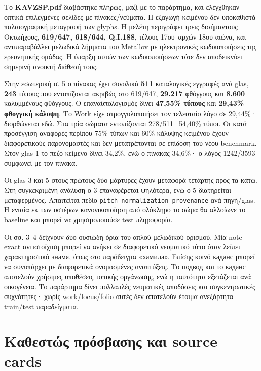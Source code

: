 \documentclass[
  10pt,
  a4paper,
]{report}
\begin{document}
Το \textbf{KAVZSP.pdf} διαβάστηκε πλήρως, μαζί με το παράρτημα, και
ελέγχθηκαν οπτικά επιλεγμένες σελίδες με πίνακες/νεύματα. Η εξαγωγή
κειμένου δεν υποκαθιστά παλαιογραφική μεταγραφή των glyphs. Η μελέτη
περιγράφει τρεις δισήμαντους Οκτωήχους, \textbf{619/647, 618/644,
Q.I.188}, τέλους 17ου--αρχών 18ου αιώνα, και αντιπαραβάλλει μελωδικά
λήμματα του Metallov με ηλεκτρονικές κωδικοποιήσεις της ερευνητικής
ομάδας. Η ύπαρξη αυτών των κωδικοποιήσεων τότε δεν αποδεικνύει σημερινή
ανοικτή διάθεσή τους.

Στην εσωτερική σ. 5 ο πίνακας έχει συνολικά \textbf{511} καταλογικές
εγγραφές ανά glas, \textbf{243} τύπους που εντοπίζονται ακριβώς στο
619/647, \textbf{29.217} φθόγγους και \textbf{8.600} καλυμμένους
φθόγγους. Ο επαναϋπολογισμός δίνει \textbf{47,55\% τύπους} και
\textbf{29,43\% φθογγική κάλυψη}. Το Work είχε στρογγυλοποιήσει τον
τελευταίο λόγο σε 29,44\%· διορθώνεται εδώ. Στα τρία σώματα εντοπίζονται
278/511=54,40\% τύποι. Οι κατά προσέγγιση αναφορές περίπου 75\% τύπων
και 60\% κάλυψης κειμένου έχουν διαφορετικούς παρονομαστές και δεν
μετατρέπονται σε επίδοση του νέου benchmark. Στον glas 1 το πεζό κείμενο
δίνει 34,2\%, ενώ ο πίνακας 34,6\%· ο λόγος 1242/3593 συμφωνεί με τον
πίνακα.

Οι glas 3 και 5 στους πρώτους δύο μάρτυρες έχουν μεταφορά τετάρτης προς
τα κάτω. Στη συγκεκριμένη ανάλυση ο 3 επαναφέρεται ψηλότερα, ενώ ο 5
διατηρείται μεταφερμένος. Απαιτείται πεδίο
\texttt{pitch\_normalization\_provenance} ανά πηγή/glas. Η ενιαία εκ των
υστέρων κανονικοποίηση από ολόκληρο το σώμα θα αλλοίωνε το baseline και
μπορεί να χρησιμοποιούσε test πληροφορία.

Οι σσ. 3--4 δείχνουν δύο ουσιώδη όρια του απλού μελωδικού ορισμού. Μία
note-exact αντιστοίχιση μπορεί να ανήκει σε διαφορετικό νευματικό τύπο
όταν λείπει χαρακτηριστικό знамя, όπως στο παράδειγμα «хамила». Επίσης
κοινό каданс μπορεί να συνυπάρχει με διαφορετικά ονομασμένες αναπτύξεις.
Το подвод και το каданс αποτελούν χρήσιμες υποθέσεις τοπικής οργάνωσης,
ενώ η ταυτότητα εξετάζεται ανά οικογένεια. Το παράρτημα δίνει πολλαπλές
νευματικές αποδόσεις και συγκεντρωτικές συχνότητες· χωρίς
work/locus/folio αυτές δεν αποτελούν έτοιμα ανεξάρτητα train/test
παραδείγματα.

\section{Καθεστώς πρόσβασης και source
cards}\label{ux3baux3b1ux3b8ux3b5ux3c3ux3c4ux3ceux3c2-ux3c0ux3c1ux3ccux3c3ux3b2ux3b1ux3c3ux3b7ux3c2-ux3baux3b1ux3b9-source-cards}
\end{document}
